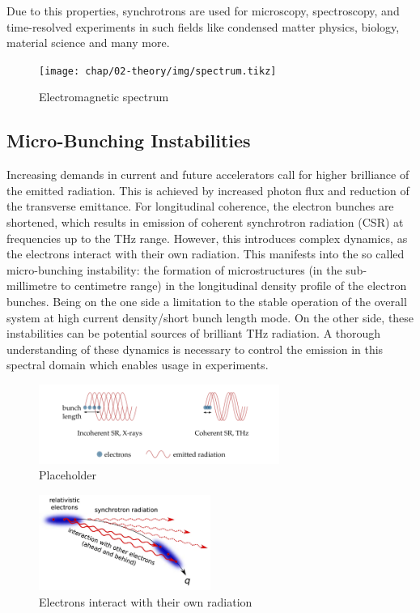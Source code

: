 Due to this properties, synchrotrons are used for microscopy, spectroscopy, and time-resolved experiments in such fields like condensed matter physics, biology, material science and many more. 
\begin{figure}[H]
	\centering
	\texttt{[image: chap/02-theory/img/spectrum.tikz]}
	\caption{Electromagnetic spectrum}
	\label{fig:spectrum}
\end{figure}

\subsection{Micro-Bunching Instabilities}
Increasing demands in current and future accelerators call for higher brilliance of the emitted radiation. This is achieved by increased photon flux and reduction of the transverse emittance. For longitudinal coherence, the electron bunches are shortened, which results in emission of coherent synchrotron radiation (CSR) at frequencies up to the THz range. However, this introduces complex dynamics, as the electrons interact with their own radiation. This manifests into the so called micro-bunching instability: the formation of microstructures (in the sub-millimetre to centimetre range) in the longitudinal density profile of the electron bunches. Being on the one side a limitation to the stable operation of the overall system at high current density/short bunch length mode. On the other side, these instabilities can be potential sources of brilliant THz radiation. A thorough understanding of these dynamics is necessary to control the emission in this spectral domain which enables usage in experiments. \cite{rota2018} \cite{brosi}

\begin{figure}[H]
	\centering
	\includegraphics[width = 0.7\textwidth]{chap/02-theory/img/csr2.png}
	\caption{Placeholder \cite{rota2018}}
	\label{fig:csr}
\end{figure}

\begin{figure}[H]
	\centering
	\includegraphics[width = 0.5\textwidth]{chap/02-theory/img/microbunching}
	\caption{Electrons interact with their own radiation \cite{Bielawski2019}}
	\label{fig:microBunch}
\end{figure}

